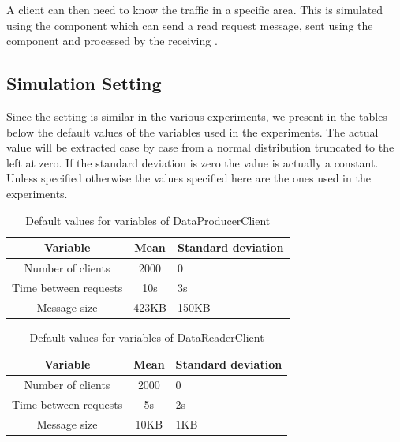 A client can then need to know the traffic in a specific area. This is simulated using the  component which can send a read request message, sent using the  component and processed by the receiving .


\subsection{Simulation Setting}
\label{section:simulation_setting}
Since the setting is similar in the various experiments, we present in the tables below the default values of the variables used in the experiments. The actual value will be extracted case by case from a normal distribution truncated to the left at zero. If the standard deviation is zero the value is actually a constant. Unless specified otherwise the values specified here are the ones used in the experiments.

\begin{table}[H]
\centering
\begin{tabular}{|c|c|l|}
\rowcolor{bluepoli!40} %
\hline
\textbf{Variable}       & \textbf{Mean}   & \textbf{Standard deviation}    \\ \hline \hline
Number of clients       & 2000            & 0                              \\ \hline
Time between requests   & 10s             & 3s                             \\ \hline
Message size            & 423KB           & 150KB                          \\ \hline
\end{tabular}
\caption{Default values for variables of DataProducerClient}
\label{tab:default_setting_data_producer}
\end{table}

\begin{table}[H]
\centering
\begin{tabular}{|c|c|l|}
\rowcolor{bluepoli!40} %
\hline
\textbf{Variable}       & \textbf{Mean}   & \textbf{Standard deviation}   \\ \hline \hline
Number of clients       & 2000            & 0                             \\ \hline
Time between requests   & 5s              & 2s                            \\ \hline
Message size            & 10KB            & 1KB                           \\ \hline
\end{tabular}
\caption{Default values for variables of DataReaderClient}
\label{tab:default_setting_data_reader}
\end{table}

